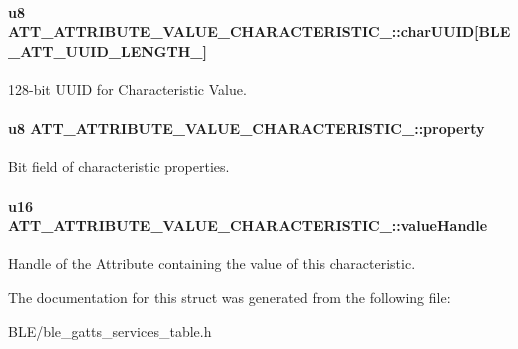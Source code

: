 \paragraph[{\texorpdfstring{char\+U\+U\+ID}{charUUID}}]{\setlength{\rightskip}{0pt plus 5cm}u8 A\+T\+T\+\_\+\+A\+T\+T\+R\+I\+B\+U\+T\+E\+\_\+\+V\+A\+L\+U\+E\+\_\+\+C\+H\+A\+R\+A\+C\+T\+E\+R\+I\+S\+T\+I\+C\+\_\+::char\+U\+U\+ID\mbox{[}{\bf B\+L\+E\+\_\+\+A\+T\+T\+\_\+\+U\+U\+I\+D\+\_\+\+L\+E\+N\+G\+T\+H\+\_}\mbox{]}}\hypertarget{struct_a_t_t___a_t_t_r_i_b_u_t_e___v_a_l_u_e___c_h_a_r_a_c_t_e_r_i_s_t_i_c__16_ad44745bf0e2c53f54b9c7886bc03763a}{}\label{struct_a_t_t___a_t_t_r_i_b_u_t_e___v_a_l_u_e___c_h_a_r_a_c_t_e_r_i_s_t_i_c__16_ad44745bf0e2c53f54b9c7886bc03763a}
128-\/bit U\+U\+ID for Characteristic Value. 
\paragraph[{\texorpdfstring{property}{property}}]{\setlength{\rightskip}{0pt plus 5cm}u8 A\+T\+T\+\_\+\+A\+T\+T\+R\+I\+B\+U\+T\+E\+\_\+\+V\+A\+L\+U\+E\+\_\+\+C\+H\+A\+R\+A\+C\+T\+E\+R\+I\+S\+T\+I\+C\+\_\+::property}\hypertarget{struct_a_t_t___a_t_t_r_i_b_u_t_e___v_a_l_u_e___c_h_a_r_a_c_t_e_r_i_s_t_i_c__16_aeb257f71738591eb1cc93084e83e242b}{}\label{struct_a_t_t___a_t_t_r_i_b_u_t_e___v_a_l_u_e___c_h_a_r_a_c_t_e_r_i_s_t_i_c__16_aeb257f71738591eb1cc93084e83e242b}
Bit field of characteristic properties. 
\paragraph[{\texorpdfstring{value\+Handle}{valueHandle}}]{\setlength{\rightskip}{0pt plus 5cm}u16 A\+T\+T\+\_\+\+A\+T\+T\+R\+I\+B\+U\+T\+E\+\_\+\+V\+A\+L\+U\+E\+\_\+\+C\+H\+A\+R\+A\+C\+T\+E\+R\+I\+S\+T\+I\+C\+\_\+::value\+Handle}\hypertarget{struct_a_t_t___a_t_t_r_i_b_u_t_e___v_a_l_u_e___c_h_a_r_a_c_t_e_r_i_s_t_i_c__16_a03bef1d19b63864b997e6bb8ebf02971}{}\label{struct_a_t_t___a_t_t_r_i_b_u_t_e___v_a_l_u_e___c_h_a_r_a_c_t_e_r_i_s_t_i_c__16_a03bef1d19b63864b997e6bb8ebf02971}
Handle of the Attribute containing the value of this characteristic. 

The documentation for this struct was generated from the following file\+:\begin{DoxyCompactItemize}
\item 
B\+L\+E/ble\+\_\+gatts\+\_\+services\+\_\+table.\+h\end{DoxyCompactItemize}
